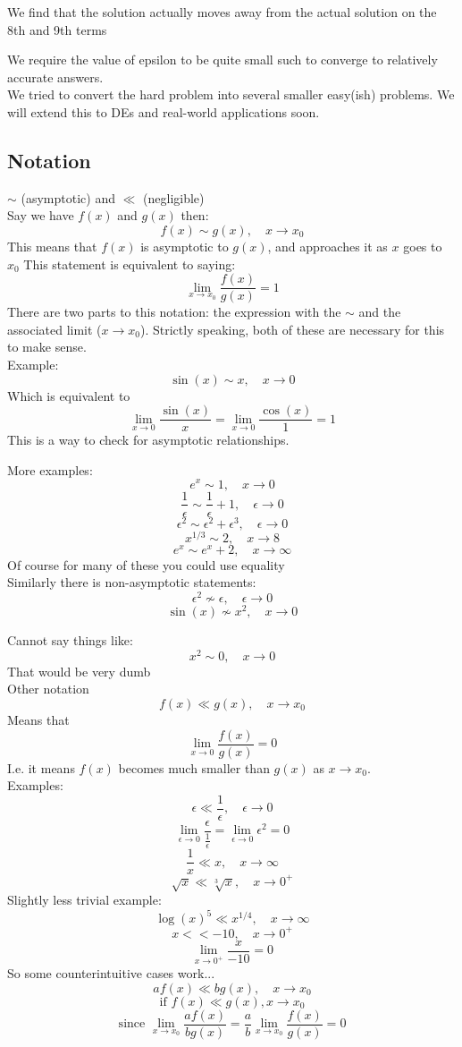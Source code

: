 \documentclass{X:/Documents/Coding/Latex/myassignment}
\begin{document}
We find that the solution actually moves away from the actual solution on the 8th and 9th terms

We require the value of epsilon to be quite small such to converge to relatively accurate answers.\\

We tried to convert the hard problem into several smaller easy(ish) problems. We will extend this to DEs and real-world applications soon.

\subsection{Notation}
$\sim$ (asymptotic) and $\ll$ (negligible)\\
Say we have $f(x)$ and $g(x)$ then:
\[f(x) \sim g(x), \quad x\to x_0\]
This means that $f(x)$ is asymptotic to $g(x)$, and approaches it as $x$ goes to $x_0$
This statement is equivalent to saying:
\[\lim_{x\to x_0} \frac{f(x)}{g(x)} = 1\]
There are two parts to this notation: the expression with the $\sim$ and the associated limit ($x\to x_0$). Strictly speaking, both of these are necessary for this to make sense.\\

Example:
\[\sin(x) \sim x, \quad x\to 0\]
Which is equivalent to
\[\lim_{x\to 0} \frac{\sin(x)}{x} = \lim_{x\to 0} \frac{\cos(x)}{1} = 1\]
This is a way to check for asymptotic relationships.

More examples: 
\[e^x \sim 1, \quad x\to0\]
\[\frac1{\epsilon} \sim \frac1\epsilon + 1, \quad \epsilon\to 0\]
\[\epsilon^2 \sim \epsilon^2 + \epsilon^3, \quad \epsilon\to 0\]
\[x^{1/3} \sim 2, \quad x \to 8\]
\[e^x \sim e^x + 2, \quad x\to\infty\]
Of course for many of these you could use equality\\
Similarly there is non-asymptotic statements:
\[\epsilon^2 \not\sim \epsilon, \quad \epsilon\to 0\]
\[\sin(x) \not\sim x^2, \quad x\to 0\]

Cannot say things like:
\[x^2 \sim 0, \quad x\to 0\]
That would be very dumb\\
Other notation
\[f(x) \ll g(x), \quad x\to x_0\]
Means that
\[\lim_{x\to 0} \frac{f(x)}{g(x)} = 0\]
I.e. it means $f(x)$ becomes much smaller than $g(x)$ as $x\to x_0$.\\
Examples:
\[\epsilon\ll \frac1\epsilon, \quad \epsilon\to 0\]
\[\lim_{\epsilon\to 0} \frac{\epsilon}{\frac{1}{\epsilon}} = \lim_{\epsilon\to 0} \epsilon^2 = 0\]
\[\frac1x \ll x, \quad x\to \infty\]
\[\sqrt{x} \ll \sqrt[3]{x},\quad x\to 0^+\]
Slightly less trivial example:
\[\log(x)^5 \ll x^{1/4}, \quad x\to\infty\]
\[x << -10, \quad x\to 0^+\]
\[\lim_{x\to0^+}\frac{x}{-10} = 0\]
So some counterintuitive cases work...
\[af(x) \ll bg(x), \quad x\to x_0\]
\[\text{if }f(x)\ll g(x), x\to x_0\]
\[\text{since }\lim_{x\to x_0}\frac{af(x)}{bg(x)} = \frac{a}{b} \lim_{x\to x_0} \frac{f(x)}{g(x)} = 0 \]
\end{document}
